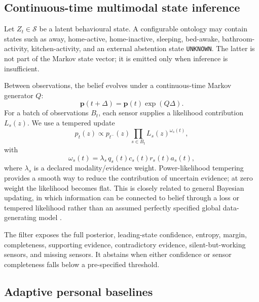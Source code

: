 \documentclass[11pt]{article}
\newcommand{\calS}{\mathcal{S}}
\begin{document}
\subsection{Continuous-time multimodal state inference}

Let $Z_t\in\calS$ be a latent behavioural state. A configurable ontology may contain states such as away, home-active, home-inactive, sleeping, bed-awake, bathroom-activity, kitchen-activity, and an external abstention state \texttt{UNKNOWN}. The latter is not part of the Markov state vector; it is emitted only when inference is insufficient.

Between observations, the belief evolves under a continuous-time Markov generator $Q$:
\begin{equation}
    \boldsymbol{p}(t+\Delta)
    = \boldsymbol{p}(t)\exp(Q\Delta).
\end{equation}
For a batch of observations $B_t$, each sensor supplies a likelihood contribution $L_s(z)$. We use a tempered update
\begin{equation}
    p_t(z)
    \propto
    p_{t^-}(z)
    \prod_{s\in B_t} L_s(z)^{\omega_s(t)},
\end{equation}
with
\begin{equation}
    \omega_s(t)=\lambda_s\,q_s(t)c_s(t)r_s(t)a_s(t),
\end{equation}
where $\lambda_s$ is a declared modality/evidence weight. Power-likelihood tempering provides a smooth way to reduce the contribution of uncertain evidence; at zero weight the likelihood becomes flat. This is closely related to general Bayesian updating, in which information can be connected to belief through a loss or tempered likelihood rather than an assumed perfectly specified global data-generating model \citep{bissiri2016general}.

The filter exposes the full posterior, leading-state confidence, entropy, margin, completeness, supporting evidence, contradictory evidence, silent-but-working sensors, and missing sensors. It abstains when either confidence or sensor completeness falls below a pre-specified threshold.

\subsection{Adaptive personal baselines}
\end{document}
